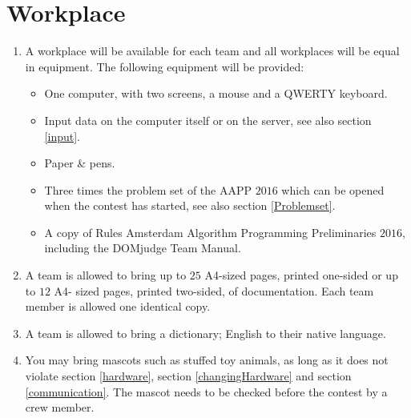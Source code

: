 \documentclass[11pt]{report}
\begin{document}
\section{Workplace}
\begin{enumerate}[label=\bfseries 4.3.\arabic*]
\item A workplace will be available for each team and all workplaces will be equal in equipment. The following equipment will be provided:
\begin{itemize}
	\item One computer, with two screens, a mouse and a QWERTY keyboard. %
	\item Input data on the computer itself or on the server, see also section \ref{input}.
	\item Paper \& pens.
	\item Three times the problem set of the AAPP $2016$ which can be opened when the contest has started, see also section \ref{Problemset}.
	\item A copy of Rules Amsterdam Algorithm Programming Preliminaries $2016$, including the DOMjudge Team Manual.
\end{itemize}
\item A team is allowed to bring up to $25$ A4-sized pages, printed one-sided or up to $12$ A4- sized pages, printed two-sided, of documentation. Each team member is allowed one identical copy.
\item A team is allowed to bring a dictionary; English to their native language.
\item You may bring mascots such as stuffed toy animals, as long as it does not violate section \ref{hardware}, section \ref{changingHardware} and section \ref{communication}. The mascot needs to be checked before the contest by a crew member.
\end{enumerate}
\end{document}
